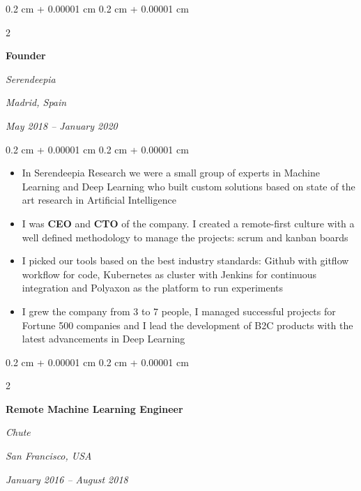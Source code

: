 \documentclass[10pt, letterpaper]{article}
\newenvironment{highlights}{
	\begin{itemize}[
		topsep=0.10 cm,
		parsep=0.10 cm,
		partopsep=0pt,
		itemsep=0pt,
		leftmargin=0.4 cm + 10pt
	]
	}{
	\end{itemize}
} %
\newenvironment{onecolentry}{
	\begin{adjustwidth}{
		0.2 cm + 0.00001 cm
	}{
		0.2 cm + 0.00001 cm
	}
	}{
	\end{adjustwidth}
} %
\newenvironment{twocolentry}[2][]{
	\onecolentry
	\def\secondColumn{#2}
	\setcolumnwidth{\fill, 5.5 cm}
	\begin{paracol}{2}
	}{
		\switchcolumn \raggedleft \secondColumn
	\end{paracol}
	\endonecolentry
} %
\begin{document}
	\vspace{0.2 cm}

	\begin{twocolentry}{
		\textit{Madrid, Spain}
		
		\textit{May 2018 – January 2020}}
		\textbf{Founder}
		
		\textit{Serendeepia}
	\end{twocolentry}

	\vspace{0.10 cm}
	\begin{onecolentry}
		\begin{highlights}
			\item In Serendeepia Research we were a small group of experts in Machine Learning and Deep Learning who built custom solutions based on state of the art research in Artificial Intelligence
			\item I was \textbf{CEO} and \textbf{CTO} of the company. I created a remote-first culture with a well defined methodology to manage the projects: scrum and kanban boards
			\item I picked our tools based on the best industry standards: Github with gitflow workflow for code, Kubernetes as cluster with Jenkins for continuous integration and Polyaxon as the platform to run experiments
			\item I grew the company from 3 to 7 people, I managed successful projects for Fortune 500 companies and I lead the development of B2C products with the latest advancements in Deep Learning
		\end{highlights}
	\end{onecolentry}

	\vspace{0.2 cm}

	\begin{twocolentry}{
		\textit{San Francisco, USA}
		
		\textit{January 2016 – August 2018}}
		\textbf{Remote Machine Learning Engineer}
		
		\textit{Chute}
	\end{twocolentry}
\end{document}
